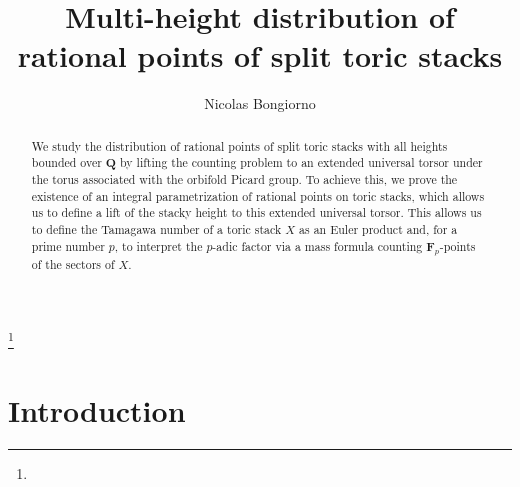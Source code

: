 \documentclass{proc-l}
\newcommand{\Z}{\mathbf{Z}}
\newcommand{\Q}{\mathbf{Q}}
\newcommand{\F}{\mathbf{F}}
\theoremstyle{definition}
\theoremstyle{remark}
\numberwithin{equation}{section}
\begin{document}
\title[Multi-height analysis on toric stacks]{Multi-height distribution of rational points of split toric stacks}


\author{Nicolas Bongiorno}
\address{}
\curraddr{}
\thanks{}



\subjclass[2020]{}

\date{}

\dedicatory{}


\begin{abstract}
We study the distribution of rational points of split toric stacks with all heights bounded over $\Q$ by lifting the counting problem to an extended universal torsor under the torus associated with the orbifold Picard group. To achieve this, we prove the existence of an integral parametrization of rational points on toric stacks, which allows us to define a lift of the stacky height to this extended universal torsor. This allows us to define the Tamagawa number of a toric stack $X$ as an Euler product and, for a prime number $p$, to interpret the $p$-adic factor via a mass formula counting $\F_p$-points of the sectors of $X$.
\end{abstract}






\maketitle

\setcounter{tocdepth}{1} 
\tableofcontents


\section{Introduction}
\end{document}
